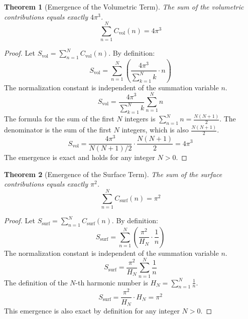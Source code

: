 \documentclass[12pt,a4paper]{article}
\theoremstyle{plain}
\newtheorem{theorem}{Theorem}[section]
\theoremstyle{definition}
\theoremstyle{remark}
\begin{document}
\begin{theorem}[Emergence of the Volumetric Term]
The sum of the volumetric contributions equals exactly $4\pi^3$.
\begin{equation}
\sum_{n=1}^{N} C_{\text{vol}}(n) = 4\pi^3
\end{equation}
\end{theorem}
\begin{proof}
Let $S_{\text{vol}} = \sum_{n=1}^{N} C_{\text{vol}}(n)$. By definition:
\[ S_{\text{vol}} = \sum_{n=1}^{N} \left( \frac{4\pi^3}{\sum_{k=1}^{N} k} \cdot n \right) \]
The normalization constant is independent of the summation variable $n$.
\[ S_{\text{vol}} = \frac{4\pi^3}{\sum_{k=1}^{N} k} \sum_{n=1}^{N} n \]
The formula for the sum of the first $N$ integers is $\sum_{n=1}^{N} n = \frac{N(N+1)}{2}$. The denominator is the sum of the first $N$ integers, which is also $\frac{N(N+1)}{2}$.
\[ S_{\text{vol}} = \frac{4\pi^3}{N(N+1)/2} \cdot \frac{N(N+1)}{2} = 4\pi^3 \]
The emergence is exact and holds for any integer $N > 0$.
\end{proof}

\begin{theorem}[Emergence of the Surface Term]
The sum of the surface contributions equals exactly $\pi^2$.
\begin{equation}
\sum_{n=1}^{N} C_{\text{surf}}(n) = \pi^2
\end{equation}
\end{theorem}
\begin{proof}
Let $S_{\text{surf}} = \sum_{n=1}^{N} C_{\text{surf}}(n)$. By definition:
\[ S_{\text{surf}} = \sum_{n=1}^{N} \left( \frac{\pi^2}{H_N} \cdot \frac{1}{n} \right) \]
The normalization constant is independent of the summation variable $n$.
\[ S_{\text{surf}} = \frac{\pi^2}{H_N} \sum_{n=1}^{N} \frac{1}{n} \]
The definition of the $N$-th harmonic number is $H_N = \sum_{n=1}^{N} \frac{1}{n}$.
\[ S_{\text{surf}} = \frac{\pi^2}{H_N} \cdot H_N = \pi^2 \]
This emergence is also exact by definition for any integer $N > 0$.
\end{proof}
\end{document}
